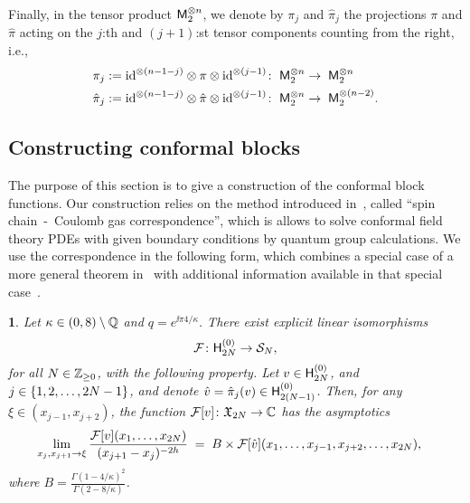 \documentclass[oneside,english]{amsart}
\numberwithin{equation}{section}
\numberwithin{figure}{section}
\theoremstyle{plain}
\theoremstyle{plain}
\theoremstyle{plain}
\theoremstyle{remark}
\theoremstyle{plain}
\newtheorem{prop}[lem]{\protect\propositionname}
\theoremstyle{plain}
\theoremstyle{plain}
\theoremstyle{plain}
\theoremstyle{plain}
\theoremstyle{plain}
\theoremstyle{plain}
\theoremstyle{plain}
\providecommand{\propositionname}{Proposition}
\newcommand{\blue}[1]{{\color{blue} #1}}
\newcommand{\red}[1]{{\color{red} #1}}
\begin{document}
Finally,
in the tensor product $\mathsf{M}_2^{\otimes n}$, we denote by $\pi_j$ and $\hat{\pi}_j$
the projections $\pi$ and $\hat{\pi}$ 
acting on the $j$:th and $(j+1)$:st tensor components counting from the right, i.e.,
\begin{align*}
\pi_j := \; & \mathrm{id}^{\otimes (n-1-j)} \otimes \pi \otimes \mathrm{id}^{\otimes (j-1)} \colon\; \mathsf{M}_{2}^{\otimes n} \to \; \mathsf{M}_{2}^{\otimes n} \\
\hat{\pi}_j := \; & \mathrm{id}^{\otimes (n-1-j)} \otimes \hat{\pi} \otimes \mathrm{id}^{\otimes (j-1)} \colon\; \mathsf{M}_{2}^{\otimes n} \to \; \mathsf{M}_{2}^{\otimes (n-2)} .
\end{align*}


\subsection{Constructing conformal blocks}
The purpose of this section is to give a construction of the conformal block functions.
Our construction relies on the method 
introduced in~\cite{KP-conformally_covariant_boundary_correlation_functions_with_a_quantum_group},
called ``spin chain~-~Coulomb gas correspondence'', %
which is allows to solve conformal field theory PDEs with given boundary conditions
by quantum group calculations. We %
use the correspondence in the following form, which combines a special case of a more general theorem
in~\cite{KP-conformally_covariant_boundary_correlation_functions_with_a_quantum_group}
with additional information available in that special case~\cite{KP-pure_partition_functions_of_multiple_SLEs}.
\begin{prop} 
\label{prop: SCCG correspondence map}
Let $\kappa \in (0,8) \setminus \mathbb{Q}$ and $q = e^{\ii \pi 4 / \kappa}$.
There exist explicit linear isomorphisms
\[ \mathcal{F} \colon \mathsf{H}_{2N}^{(0)} \to \mathcal{S}_N ,\] 
for all $N \in \mathbb{Z}_{\geq 0}$, with the following property.
Let $v \in \mathsf{H}_{2N}^{(0)}$, 
and $j \in \left\{ 1,2,\ldots,2N-1\right\}$, and denote
$\hat{v} = \hat{\pi}_{j}(v) \in \mathsf{H}_{2(N-1)}^{(0)}$.
Then, for any  $\xi \in (x_{j-1},x_{j+2})$, the function $\mathcal{F}[v] \colon \mathfrak{X}_{2N} \to \mathbb{C}$ has the asymptotics 
\begin{align*}
\lim_{x_{j},x_{j+1}\to\xi}
\frac{\mathcal{F}[v](x_{1},\ldots,x_{2N})}{(x_{j+1}-x_{j})^{-2 h}}
\; = \; \; & 
B \times 
\mathcal{F}[\hat{v}](x_{1},\ldots,x_{j-1},x_{j+2},\ldots,x_{2N}) ,
\end{align*}
where $B = \frac{\Gamma(1-4/\kappa)^2}{\Gamma(2-8/\kappa)}$.
\end{prop}
\end{document}

